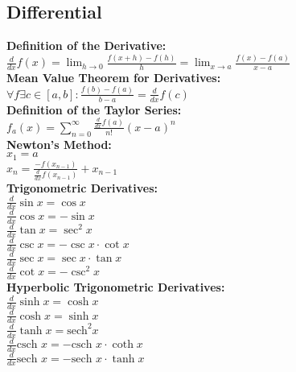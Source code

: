 \documentclass[12pt]{article}
\begin{document}
\subsection*{Differential}
\textbf{Definition of the Derivative:}
    \\ \( \displaystyle\frac{ d }{ dx } f( x ) = \displaystyle\lim_{h \rightarrow{0}} { \displaystyle\frac{ f( x + h ) - f( h ) }{ h } } = \displaystyle\lim_{x \rightarrow{a}} { \displaystyle\frac{ f( x ) - f( a ) }{ x - a } } \)
\\ \textbf{Mean Value Theorem for Derivatives:}
    \\ \( \forall f \exists c \in [a, b] : \displaystyle\frac{ f( b ) - f( a ) }{ b - a } = \displaystyle\frac{ d }{ dx } f( c ) \)
\\ \textbf{Definition of the Taylor Series:}
    \\ \( f_a( x ) = \displaystyle\sum_{n = 0}^{\infty} { \displaystyle\frac{ \frac{ d }{ dx } f( a ) }{ n! } ( x - a )^n } \)
\\ \textbf{Newton's Method:}
    \\ \( x_1 = a \)
    \\ \( x_n = \displaystyle\frac{ -f( x_{n - 1} ) }{ \frac{ d }{ dx } f( x_{n - 1} ) } + x_{n - 1} \)
\\ \textbf{Trigonometric Derivatives:}
    \\ \( \displaystyle\frac{ d }{ dx } \sin x = \cos x \)
    \\ \( \displaystyle\frac{ d }{ dx } \cos x = - \sin x \)
    \\ \( \displaystyle\frac{ d }{ dx } \tan x = \sec^2 x \)
    \\ \( \displaystyle\frac{ d }{ dx } \csc x = - \csc x \cdot \cot x \)
    \\ \( \displaystyle\frac{ d }{ dx } \sec x = \sec x \cdot \tan x \)
    \\ \( \displaystyle\frac{ d }{ dx } \cot x = - \csc^2 x \)
\\ \textbf{Hyperbolic Trigonometric Derivatives:}
    \\ \( \displaystyle\frac{ d }{ dx } \sinh x = \cosh x \)
    \\ \( \displaystyle\frac{ d }{ dx } \cosh x = \sinh x \)
    \\ \( \displaystyle\frac{ d }{ dx } \tanh x = \text{sech}^2 x \)
    \\ \( \displaystyle\frac{ d }{ dx } \text{csch } x = - \text{csch } x \cdot \coth x \)
    \\ \( \displaystyle\frac{ d }{ dx } \text{sech } x = - \text{sech } x \cdot \tanh x \)
\end{document}
